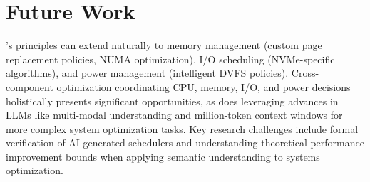 \section{Future Work}
\label{sec:future}

\sys's principles can extend naturally to memory management (custom page replacement policies, NUMA optimization), I/O scheduling (NVMe-specific algorithms), and power management (intelligent DVFS policies). Cross-component optimization coordinating CPU, memory, I/O, and power decisions holistically presents significant opportunities, as does leveraging advances in LLMs like multi-modal understanding and million-token context windows for more complex system optimization tasks. Key research challenges include formal verification of AI-generated schedulers and understanding theoretical performance improvement bounds when applying semantic understanding to systems optimization.